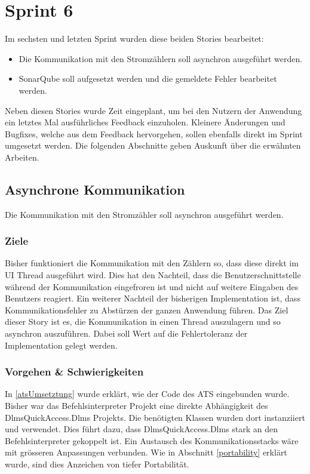 \section{Sprint 6}\label{s6}
Im sechsten und letzten Sprint wurden diese beiden Stories bearbeitet:
\begin{itemize}
   \item Die Kommunikation mit den Stromzählern soll asynchron ausgeführt werden.
   \item SonarQube soll aufgesetzt werden und die gemeldete Fehler bearbeitet werden.
\end{itemize}
Neben diesen Stories wurde Zeit eingeplant, um bei den Nutzern der Anwendung ein letztes Mal ausführliches Feedback einzuholen.
Kleinere Änderungen und Bugfixes, welche aus dem Feedback hervorgehen, sollen ebenfalls direkt im Sprint umgesetzt werden.
Die folgenden Abschnitte geben Auskunft über die erwähnten Arbeiten.

\subsection{Asynchrone Kommunikation}
\dq Die Kommunikation mit den Stromzähler soll asynchron ausgeführt werden.\dq
\subsubsection{Ziele}
Bisher funktioniert die Kommunikation mit den Zählern so, dass diese direkt im UI Thread ausgeführt wird.
Dies hat den Nachteil, dass die Benutzerschnittstelle während der Kommunikation eingefroren ist und nicht auf weitere Eingaben des Benutzers reagiert.
Ein weiterer Nachteil der bisherigen Implementation ist, dass Kommunikationsfehler zu Abstürzen der ganzen Anwendung führen.
Das Ziel dieser Story ist es, die Kommunikation in einen Thread auszulagern und so asynchron auszuführen.
Dabei soll Wert auf die Fehlertoleranz der Implementation gelegt werden.


\subsubsection{Vorgehen \& Schwierigkeiten}\label{s6vorgehenasync}
In \ref{atsUmsetztung} wurde erklärt, wie der Code des \ac{ATS} eingebunden wurde.
Bisher war das Befehlsinterpreter Projekt eine direkte Abhängigkeit des DlmsQuickAccess.Dlms Projekts.
Die benötigten Klassen wurden dort instanziiert und verwendet. 
Dies führt dazu, dass DlmsQuickAccess.Dlms stark an den Befehlsinterpreter gekoppelt ist.
Ein Austausch des Kommunikationsstacks wäre mit grösseren Anpassungen verbunden.
Wie in Abschnitt \ref{portability} erklärt wurde, sind dies Anzeichen von tiefer Portabilität.

